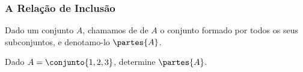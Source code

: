 \begin{frame}
	\frametitle{A Relação de Inclusão} 

	\begin{definicao}
		Dado um conjunto $A$, chamamos de  de $A$ o conjunto formado por todos os seus subconjuntos, e denotamo-lo $\partes{A}$.
	\end{definicao}\pause

	\begin{exemplo}
		Dado $A = \conjunto {1, 2, 3}$, determine $\partes{A}$.
	\end{exemplo}
\end{frame}